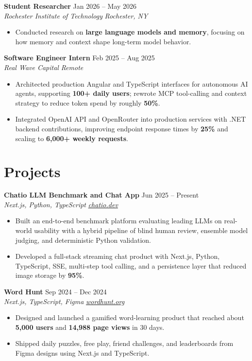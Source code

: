 \documentclass[10pt,letterpaper]{article}
\newif\ifresumeFirstRole
\newcommand{\resumeRole}[4]{%
  \ifresumeFirstRole
    \global\resumeFirstRolefalse
  \else
    \vspace{0pt plus 1fill}%
  \fi
  \textbf{#1} \hfill #2\\
  \textit{#3} \hfill \textit{#4}
}
\begin{document}
\resumeRole{Student Researcher}{Jan 2026 -- May 2026}{Rochester Institute of Technology}{Rochester, NY}
\begin{itemize}
  \item Conducted research on \textbf{large language models and memory}, focusing on how memory and context shape long-term model behavior.
\end{itemize}

\resumeRole{Software Engineer Intern}{Feb 2025 -- Aug 2025}{Real Wave Capital}{Remote}
\begin{itemize}
  \item Architected production Angular and TypeScript interfaces for autonomous AI agents, supporting \textbf{100+ daily users}; rewrote MCP tool-calling and context strategy to reduce token spend by roughly \textbf{50\%}.
  \item Integrated OpenAI API and OpenRouter into production services with .NET backend contributions, improving endpoint response times by \textbf{25\%} and scaling to \textbf{6,000+ weekly requests}.
\end{itemize}

\section*{Projects}
\resumeRole{Chatio LLM Benchmark and Chat App}{Jun 2025 -- Present}{Next.js, Python, TypeScript}{\href{https://chatio.dev}{chatio.dev}}
\begin{itemize}
  \item Built an end-to-end benchmark platform evaluating leading LLMs on real-world usability with a hybrid pipeline of blind human review, ensemble model judging, and deterministic Python validation.
  \item Developed a full-stack streaming chat product with Next.js, Python, TypeScript, SSE, multi-step tool calling, and a persistence layer that reduced image storage by \textbf{95\%}.
\end{itemize}

\resumeRole{Word Hunt}{Sep 2024 -- Dec 2024}{Next.js, TypeScript, Figma}{\href{https://wordhunt.org}{wordhunt.org}}
\begin{itemize}
  \item Designed and launched a gamified word-learning product that reached about \textbf{5,000 users} and \textbf{14,988 page views} in 30 days.
  \item Shipped daily puzzles, free play, friend challenges, and leaderboards from Figma designs using Next.js and TypeScript.
\end{itemize}
\end{document}
